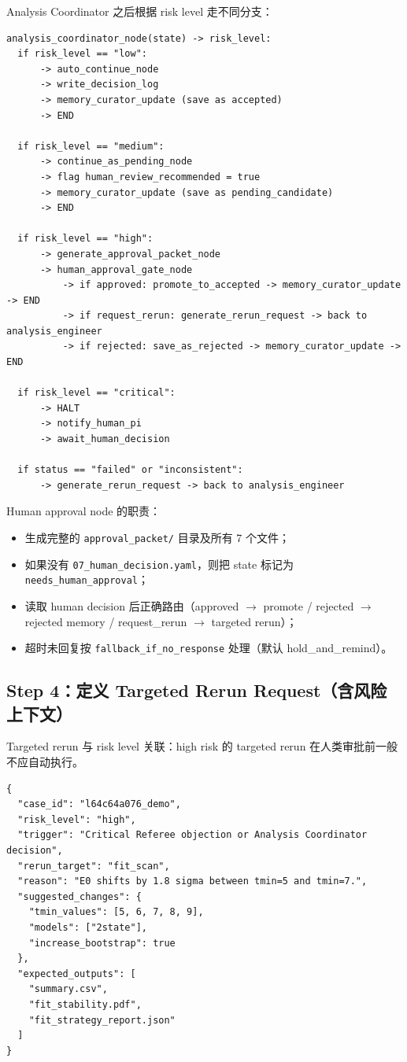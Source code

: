 \documentclass[11pt,a4paper,fontset=none]{ctexart}
\begin{document}
Analysis Coordinator 之后根据 risk level 走不同分支：

\begin{lstlisting}
analysis_coordinator_node(state) -> risk_level:
  if risk_level == "low":
      -> auto_continue_node
      -> write_decision_log
      -> memory_curator_update (save as accepted)
      -> END

  if risk_level == "medium":
      -> continue_as_pending_node
      -> flag human_review_recommended = true
      -> memory_curator_update (save as pending_candidate)
      -> END

  if risk_level == "high":
      -> generate_approval_packet_node
      -> human_approval_gate_node
          -> if approved: promote_to_accepted -> memory_curator_update -> END
          -> if request_rerun: generate_rerun_request -> back to analysis_engineer
          -> if rejected: save_as_rejected -> memory_curator_update -> END

  if risk_level == "critical":
      -> HALT
      -> notify_human_pi
      -> await_human_decision

  if status == "failed" or "inconsistent":
      -> generate_rerun_request -> back to analysis_engineer
\end{lstlisting}

Human approval node 的职责：
\begin{itemize}[leftmargin=2em]
  \item 生成完整的 \texttt{approval\_packet/} 目录及所有 7 个文件；
  \item 如果没有 \texttt{07\_human\_decision.yaml}，则把 state 标记为 \texttt{needs\_human\_approval}；
  \item 读取 human decision 后正确路由（approved $\to$ promote / rejected $\to$ rejected memory / request\_rerun $\to$ targeted rerun）；
  \item 超时未回复按 \texttt{fallback\_if\_no\_response} 处理（默认 hold\_and\_remind）。
\end{itemize}

\subsection{Step 4：定义 Targeted Rerun Request（含风险上下文）}

Targeted rerun 与 risk level 关联：high risk 的 targeted rerun 在人类审批前一般不应自动执行。

\begin{lstlisting}
{
  "case_id": "l64c64a076_demo",
  "risk_level": "high",
  "trigger": "Critical Referee objection or Analysis Coordinator decision",
  "rerun_target": "fit_scan",
  "reason": "E0 shifts by 1.8 sigma between tmin=5 and tmin=7.",
  "suggested_changes": {
    "tmin_values": [5, 6, 7, 8, 9],
    "models": ["2state"],
    "increase_bootstrap": true
  },
  "expected_outputs": [
    "summary.csv",
    "fit_stability.pdf",
    "fit_strategy_report.json"
  ]
}
\end{lstlisting}
\end{document}

